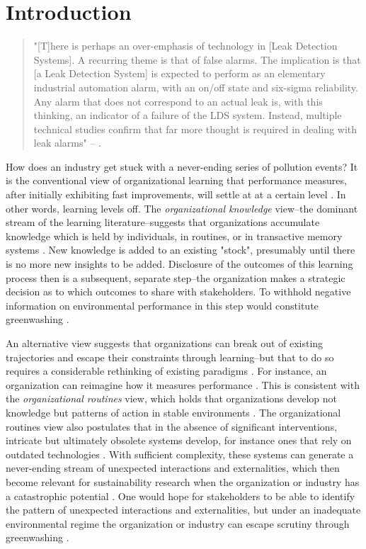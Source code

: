 \section{Introduction}

\begin{singlespace} 
	\begin{quote}
		"[T]here is perhaps an over-emphasis of technology in [Leak Detection Systems]. A recurring theme is that of false alarms. The implication is that [a Leak Detection System] is expected to perform as an elementary industrial automation alarm, with an on/off state and six-sigma reliability. Any alarm that does not correspond to an actual leak is, with this thinking, an indicator of a failure of the LDS system. Instead, multiple technical studies confirm that far more thought is required in dealing with leak alarms" -- \citet[p. 2-3]{Shaw2012}.
	\end{quote}
\end{singlespace}

How does an industry get stuck with a never-ending series of pollution events? It is the conventional view of organizational learning that performance measures, after initially exhibiting fast improvements, will settle at at a certain level \citep{Argote2013-1}. In other words, learning levels off. The \textit{organizational knowledge} view--the dominant stream of the learning literature--suggests that organizations accumulate knowledge which is held by individuals, in routines, or in transactive memory systems \citep{Bingham2011, Argote2011}. New knowledge is added to an existing "stock", presumably until there is no more new insights to be added. Disclosure of the outcomes of this learning process then is a subsequent, separate step--the organization makes a strategic decision as to which outcomes to share with stakeholders. To withhold negative information on environmental performance in this step would constitute greenwashing \citep{Lyon2011}.

An alternative view suggests that organizations can break out of existing trajectories and escape their constraints through learning--but that to do so requires a considerable rethinking of existing paradigms \citep{March2010}. For instance, an organization can reimagine how it measures performance \citep{Argyris1978}. This is consistent with the \textit{organizational routines} view, which holds that organizations develop not knowledge but patterns of action in stable environments \citep{Bingham2011}. The organizational routines view also postulates that in the absence of significant interventions, intricate but ultimately obsolete systems develop, for instance ones that rely on outdated technologies \citep{March1991}. With sufficient complexity, these systems can generate a never-ending stream of unexpected interactions and externalities, which then become relevant for sustainability research when the organization or industry has a catastrophic potential \citep{Perrow1984, Beck1992}. One would hope for stakeholders to be able to identify the pattern of unexpected interactions and externalities, but under an inadequate environmental regime the organization or industry can escape scrutiny through greenwashing \citep{Lyon2015}.

